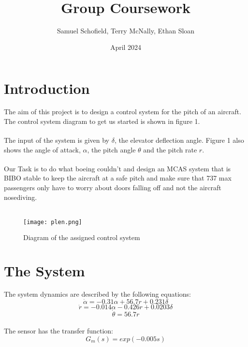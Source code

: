 \documentclass{article}
\title{Group Coursework}
\author{Samuel Schofield, Terry McNally, Ethan Sloan}
\date{April 2024}
\begin{document}
\maketitle

\section{Introduction}
The aim of this project is to design a control system for the pitch of an aircraft. The control system diagram to get us started is shown in figure 1.\\\\
The input of the system is given by \(\delta\), the elevator deflection angle. Figure 1 also shows the angle of attack, \(\alpha\), the pitch angle \(\theta\) and the pitch rate \(r\).\\\\
Our Task is to do what boeing couldn't and design an MCAS system that is BIBO stable to keep the aircraft at a safe pitch and make sure that 737 max passengers only have to worry about doors falling off and not the aircraft nosediving.\\\\



\begin{figure}
    \centering
    \texttt{[image: plen.png]}
    \caption{Diagram of the assigned control system}
    \label{fig:Figure 1}
\end{figure}

\section{The System}
The system dynamics are described by the following equations:
\[\dot{\alpha}=-0.31\alpha + 56.7r + 0.231\delta\]
\[\dot{r}=-0.014\alpha - 0.426r +0.0203\delta\]
\[\dot{\theta} = 56.7r\]\\
The sensor has the transfer function:
\[G_m(s) = exp(-0.005s)\]
\newpage
\end{document}
